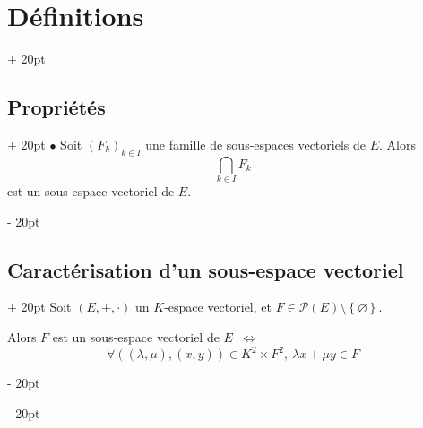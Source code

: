 \documentclass[a4paper, 12pt, twoside]{article}
\newcommand{\set}[1]{\left\{ #1 \right\}}
\newcommand{\ssi}{\ \Leftrightarrow \ }
\newcommand{\ind}[1][20pt]{\advance\leftskip + #1}
\newcommand{\deind}[1][20pt]{\advance\leftskip - #1}
\newenvironment{indt}[2][20pt]{#2 \par \ind[#1]}{\par \deind} %
\begin{document}
\begin{indt}{\section{Définitions}}
\begin{indt}{\subsection{Propriétés}}
            $\bullet$ Soit $(F_k)_{k \in I}$ une famille de sous-espaces vectoriels de $E$. Alors
                \[ \bigcap_{k \in I} F_k \]
            est un sous-espace vectoriel de $E$.
        \end{indt}
        
        \vspace{12pt}
        
        \begin{indt}{\subsection{Caractérisation d'un sous-espace vectoriel}}
            Soit $(E, +, \cdot)$ un $K$-espace vectoriel, et $F \in \mathcal P(E) \setminus \set \varnothing$.
            
            \vspace{6pt}
            
            Alors $F$ est un sous-espace vectoriel de $E$ $\ssi$
                \[ \forall ((\lambda, \mu), (x, y)) \in K^2 \times F^2,\ \lambda x + \mu y \in F \]
        \end{indt}
        
    \end{indt}
    
    \vspace{12pt}
    
\end{document}
